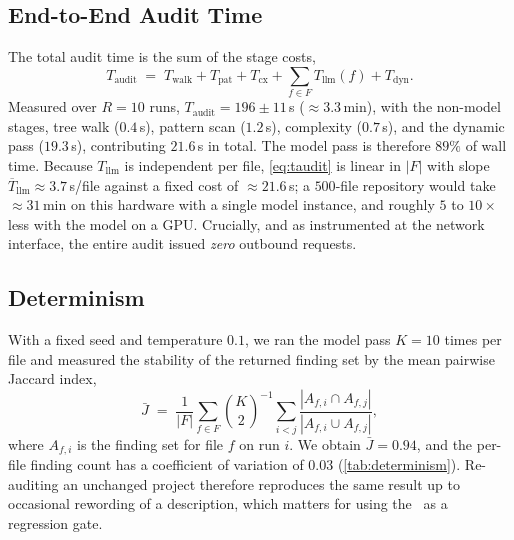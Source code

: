 \subsection{End-to-End Audit Time}
The total audit time is the sum of the stage costs,
\begin{equation}
 T_{\text{audit}} \;=\; T_{\text{walk}} + T_{\text{pat}}
 + T_{\text{cx}} + \sum_{f \in F} T_{\text{llm}}(f)
 + T_{\text{dyn}}.
 \label{eq:taudit}
\end{equation}
Measured over $R=10$ runs, $T_{\text{audit}} = 196 \pm 11$\,s
($\approx 3.3$\,min), with the non-model stages, tree walk
($0.4$\,s), pattern scan ($1.2$\,s), complexity ($0.7$\,s), and the
dynamic pass ($19.3$\,s), contributing $21.6$\,s in total. The model
pass is therefore $89\%$ of wall time. Because $T_{\text{llm}}$ is
independent per file, \cref{eq:taudit} is linear in $|F|$ with slope
$\overline{T}_{\text{llm}}\approx 3.7$\,s/file against a fixed cost of
$\approx 21.6$\,s; a $500$-file repository would take $\approx 31$\,min
on this hardware with a single model instance, and roughly
$5$ to $10\times$ less with the model on a GPU. Crucially, and as
instrumented at the network interface, the entire audit issued
\emph{zero} outbound requests.

\subsection{Determinism}
With a fixed seed and temperature $0.1$, we ran the model pass $K=10$
times per file and measured the stability of the returned finding set by
the mean pairwise Jaccard index,
\begin{equation}
 \bar{J} \;=\; \frac{1}{|F|}\sum_{f\in F}
 \binom{K}{2}^{-1}\!\!\sum_{i<j}
 \frac{|A_{f,i}\cap A_{f,j}|}{|A_{f,i}\cup A_{f,j}|},
 \label{eq:jaccard}
\end{equation}
where $A_{f,i}$ is the finding set for file $f$ on run $i$. We obtain
$\bar{J}=0.94$, and the per-file finding count has a coefficient of
variation of $0.03$ (\cref{tab:determinism}). Re-auditing an unchanged
project therefore reproduces the same result up to occasional
rewording of a description, which matters for using the \phindex\ as a
regression gate.

